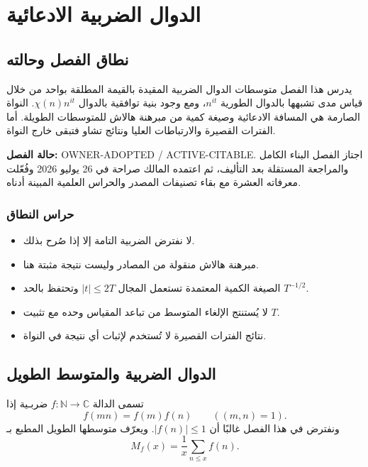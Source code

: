 \chapter{الدوال الضربية الادعائية}
\label{ch:pretentious-multiplicative-functions}

\section*{نطاق الفصل وحالته}

يدرس هذا الفصل متوسطات الدوال الضربية المقيدة بالقيمة المطلقة بواحد من خلال قياس مدى تشبهها بالدوال الطورية \(n^{it}\)، ومع وجود بنية توافقية بالدوال 
\(\chi(n)n^{it}\). النواة الصارمة هي المسافة الادعائية وصيغة كمية من مبرهنة هالاش للمتوسطات الطويلة. أما الفترات القصيرة والارتباطات العليا ونتائج تشاو فتبقى خارج النواة.

\noindent\textbf{حالة الفصل:}
\textenglish{OWNER-ADOPTED / ACTIVE-CITABLE}. اجتاز الفصل البناء الكامل والمراجعة المستقلة بعد التأليف، ثم اعتمده المالك صراحة في 26 يوليو 2026 وفُعّلت معرفاته العشرة مع بقاء تصنيفات المصدر والحراس العلمية المبينة أدناه.

\subsection*{حراس النطاق}
\begin{itemize}
  \item لا نفترض الضربية التامة إلا إذا صُرح بذلك.
  \item مبرهنة هالاش منقولة من المصادر وليست نتيجة مثبتة هنا.
  \item الصيغة الكمية المعتمدة تستعمل المجال \(|t|\le 2T\) وتحتفظ بالحد \(T^{-1/2}\).
  \item لا يُستنتج الإلغاء المتوسط من تباعد المقياس وحده مع تثبيت \(T\).
  \item نتائج الفترات القصيرة لا تُستخدم لإثبات أي نتيجة في النواة.
\end{itemize}

\section{الدوال الضربية والمتوسط الطويل}

\begin{definition}
\label{def:ch24-multiplicative-mean}
\provedhere
تسمى الدالة \(f:\mathbb N\to\mathbb C\) ضربـية إذا
\[
f(mn)=f(m)f(n)\qquad ((m,n)=1).
\]
ونفترض في هذا الفصل غالبًا أن \(|f(n)|\le1\). ويعرّف متوسطها الطويل المطبع بـ
\[
M_f(x)=\frac1x\sum_{n\le x}f(n).
\]
\end{definition}

